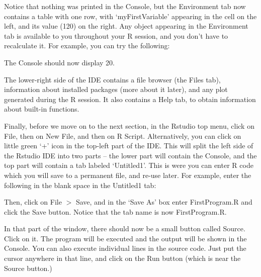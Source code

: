 Notice that nothing was printed in the Console, but the Environment tab now contains a table with one row, with `myFirstVariable' appearing in the cell on the left, and its value (120) on the right. Any object appearing in the Environment tab is available to you throughout your R session, and you don't have to recalculate it. For example, you can try the following:

\begin{Shaded}
\begin{Highlighting}[]
\SpecialCharTok{/}
\end{Highlighting}
\end{Shaded}

The Console should now display 20.

The lower-right side of the IDE contains a file browser (the Files tab), information about installed packages (more about it later), and any plot generated during the R session. It also contains a Help tab, to obtain information about built-in functions.

Finally, before we move on to the next section, in the Rstudio top menu, click on File, then on New File, and then on R Script. Alternatively, you can click on little green `+' icon in the top-left part of the IDE. This will split the left side of the Rstudio IDE into two parts -- the lower part will contain the Console, and the top part will contain a tab labeled `Untitled1'. This is were you can enter R code which you will save to a permanent file, and re-use later.
For example, enter the following in the blank space in the Untitled1 tab:

\begin{Shaded}
\begin{Highlighting}[]
\NormalTok{(}\StringTok{\textquotesingle{}}\NormalTok{)}
\end{Highlighting}
\end{Shaded}

Then, click on File \(>\) Save, and in the `Save As' box enter FirstProgram.R and click the Save button.
Notice that the tab name is now FirstProgram.R.

In that part of the window, there should now be a small button called Source. Click on it. The program will be executed and the output will be shown in the Console. You can also execute individual lines in the source code. Just put the cursor anywhere in that line, and click on the Run button (which is near the Source button.)

